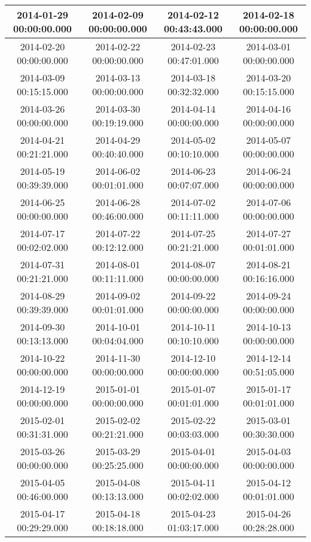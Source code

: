 \begin{longtable}{c c c c}
2014-01-29 00:00:00.000 & 
2014-02-09 00:00:00.000 & 
2014-02-12 00:43:43.000 & 
2014-02-18 00:00:00.000 \\ \midrule
2014-02-20 00:00:00.000 & 
2014-02-22 00:00:00.000 & 
2014-02-23 00:47:01.000 & 
2014-03-01 00:00:00.000 \\ \midrule
2014-03-09 00:15:15.000 & 
2014-03-13 00:00:00.000 & 
2014-03-18 00:32:32.000 & 
2014-03-20 00:15:15.000 \\ \midrule
2014-03-26 00:00:00.000 & 
2014-03-30 00:19:19.000 & 
2014-04-14 00:00:00.000 & 
2014-04-16 00:00:00.000 \\ \midrule
2014-04-21 00:21:21.000 & 
2014-04-29 00:40:40.000 & 
2014-05-02 00:10:10.000 & 
2014-05-07 00:00:00.000 \\ \midrule
2014-05-19 00:39:39.000 & 
2014-06-02 00:01:01.000 & 
2014-06-23 00:07:07.000 & 
2014-06-24 00:00:00.000 \\ \midrule
2014-06-25 00:00:00.000 & 
2014-06-28 00:46:00.000 & 
2014-07-02 00:11:11.000 & 
2014-07-06 00:00:00.000 \\ \midrule
2014-07-17 00:02:02.000 & 
2014-07-22 00:12:12.000 & 
2014-07-25 00:21:21.000 & 
2014-07-27 00:01:01.000 \\ \midrule
2014-07-31 00:21:21.000 & 
2014-08-01 00:11:11.000 & 
2014-08-07 00:00:00.000 & 
2014-08-21 00:16:16.000 \\ \midrule
2014-08-29 00:39:39.000 & 
2014-09-02 00:01:01.000 & 
2014-09-22 00:00:00.000 & 
2014-09-24 00:00:00.000 \\ \midrule
2014-09-30 00:13:13.000 & 
2014-10-01 00:04:04.000 & 
2014-10-11 00:10:10.000 & 
2014-10-13 00:00:00.000 \\ \midrule
2014-10-22 00:00:00.000 & 
2014-11-30 00:00:00.000 & 
2014-12-10 00:00:00.000 & 
2014-12-14 00:51:05.000 \\ \midrule
2014-12-19 00:00:00.000 & 
2015-01-01 00:00:00.000 & 
2015-01-07 00:01:01.000 & 
2015-01-17 00:01:01.000 \\ \midrule
2015-02-01 00:31:31.000 & 
2015-02-02 00:21:21.000 & 
2015-02-22 00:03:03.000 & 
2015-03-01 00:30:30.000 \\ \midrule
2015-03-26 00:00:00.000 & 
2015-03-29 00:25:25.000 & 
2015-04-01 00:00:00.000 & 
2015-04-03 00:00:00.000 \\ \midrule
2015-04-05 00:46:00.000 & 
2015-04-08 00:13:13.000 & 
2015-04-11 00:02:02.000 & 
2015-04-12 00:01:01.000 \\ \midrule
2015-04-17 00:29:29.000 & 
2015-04-18 00:18:18.000 & 
2015-04-23 01:03:17.000 & 
2015-04-26 00:28:28.000 \\ \midrule

\end{longtable}
